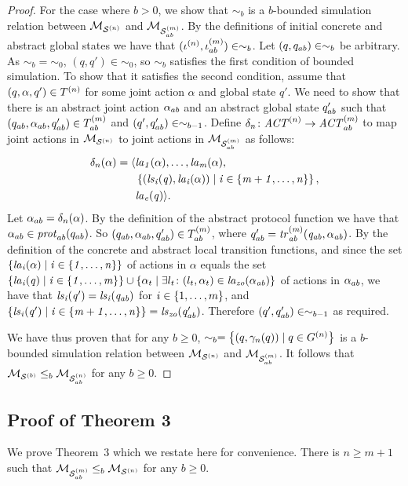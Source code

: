 \documentclass{article}
\newenvironment{customthm}[1]
  {\renewcommand\theinnercustomthm{#1}\innercustomthm}
  {\endinnercustomthm}
\begin{document}
\begin{proof}
For the case where $b >0$, 
     we
    show that $\sim_{b}$ is a $b$-bounded simulation relation  between
    $\mathcal{M}_{\mathcal{S}^{(n)}}$ and $\mathcal{M}_{\mathcal{S}_{ab}^{(m)}}$.  By the definitions of initial concrete and
    abstract global states we have that $(\iota^{({n})}, \iota^{({m})}_{ab}) \in
    \sim_{b}$.  Let $(q, q_{ab}) \in \sim_b$ be arbitrary. As $\sim_{b} =
    \sim_0$, $(q, q') \in \sim_0$, so $\sim_{b}$ satisfies the
    first condition of bounded simulation. To show that
    it satisfies the second condition,  assume that $(q, \alpha, q') \in
    T^{(n)}$ for some joint action $\alpha$ and global state $q'$. We need
    to show that there is an abstract joint action $\alpha_{ab}$ and an abstract
    global state $q_{ab}'$ such that $(q_{ab}, \alpha_{ab}, q_{ab}') \in
    T^{(m)}_{ab}$ and $(q', q_{ab}') \in \sim_{b-1}$.  Define $\delta_n \colon
    \mathit{ACT}^{(n)} \rightarrow \mathit{ACT}^{(m)}_{ab}$ to map joint actions in $\mathcal{M}_{\mathcal{S}^{(n)}}$
    to joint actions in $\mathcal{M}_{\mathcal{S}_{ab}^{(m)}}$ as follows:
\begin{align*}
  \delta_n(\alpha) =  \langle &\it{la}_{1}({\alpha}), \ldots, \it{la}_{m}({\alpha}), \\
    &\left \{ (\it{ls}_{i}(q), \it{la}_{i}({\alpha})) \mid i \in \left \{ m + 1, \ldots, n \right \} \right \}, \\
  &\it{la}_{e}({q})  \rangle.
\end{align*}
Let $\alpha_{ab} = \delta_n(\alpha)$. By the definition of the abstract protocol
function we have that $\alpha_{ab} \in \mathit{prot}_{ab}(q_{ab})$. So $(q_{ab},
\alpha_{ab}, q_{ab}') \in T^{(m)}_{ab}$, where $q_{ab}' = \it{tr}^{(m)}_{ab}
(q_{ab}, \alpha_{ab})$. By the definition of the concrete and abstract local
transition functions, and since the set $\left \{ \it{la}_{i}({\alpha}) \mid i \in
\left \{ 1,\ldots,n \right \} \right \}$ of actions in $\alpha$ equals the set $\left \{ \it{la}_{i}({q}) \mid i
\in \left \{ 1,\ldots,m \right \} \right \} \cup \left \{ \alpha_t \mid \exists l_t \colon (l_t, \alpha_t)
\in \it{la}_{zo}({\alpha_{ab}}) \right \}$ of actions in $\alpha_{ab}$, we have that $\it{ls}_{i}(q') =
\it{ls}_{i}(q_{ab})$ for $i \in \left \{ 1,\ldots,m \right \}$, and $\left \{ \it{ls}_{i}(q') \mid i \in
\left \{ m+1,\ldots,n \right \} \right \} = \it{ls}_{zo}(q_{ab}')$.  Therefore $(q', q_{ab}') \in
    \sim_{b-1}$ as required.

We have thus proven that for any $b \geq 0$, $\sim_b = \left \{ (q, \gamma_n(q))
    \mid q \in G^{(n)}  \right \}$ is a $b$-bounded simulation relation between
    $\mathcal{M}_{\mathcal{S}^{(n)}}$ and $\mathcal{M}_{\mathcal{S}_{ab}^{(m)}}$. It follows that $\mathcal{M}_{\mathcal{S}^{(b)}} \leq_b \mathcal{M}_{\mathcal{S}_{ab}^{(n)}}$ for any
    $b \geq 0$.

\end{proof}


\subsection{Proof of Theorem 3}
We prove Theorem~3 which we restate here for convenience.
\begin{customthm}{3}
There is $n \geq m+1$ such that $\mathcal{M}_{\mathcal{S}_{ab}^{(m)}} \leq_b \mathcal{M}_{\mathcal{S}^{(n)}}$ for any $b \geq 0$.
\end{customthm}
\end{document}
